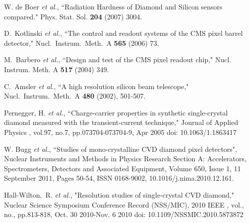 \documentclass[journal]{IEEEtran}
\begin{document}
  
\begin{thebibliography}{1}


W. de Boer \emph{et al.}, ``Radiation Hardness of Diamond and Silicon sensors compared." Phys. Stat. Sol. {\bf 204} (2007) 3004.

D.~Kotlinski \emph{et al.}, ``The control and readout systems of the CMS pixel barrel detector," Nucl.\ Instrum.\ Meth.\  A {\bf 565} (2006) 73.

M.~Barbero \emph{et al.}, ``Design and test of the CMS pixel readout chip," Nucl. Instrum. Meth. A
{\bf 517} (2004) 349.

C.~Amsler \emph{et al.}, ``A high resolution silicon beam telescope," Nucl.\ Instrum.\ Meth.\  A {\bf 480} (2002), 501-507.

Pernegger, H. \emph{et al.}, ``Charge-carrier properties in synthetic single-crystal diamond measured with the transient-current technique," Journal of Applied Physics , vol.97, no.7, pp.073704-073704-9, Apr 2005
doi: 10.1063/1.1863417

W. Bugg \emph{et al.}, ``Studies of mono-crystalline CVD diamond pixel detectors", Nuclear Instruments and Methods in Physics Research Section A: Accelerators, Spectrometers, Detectors and Associated Equipment, Volume 650, Issue 1, 11 September 2011, Pages 50-54, ISSN 0168-9002, 10.1016/j.nima.2010.12.161.

Hall-Wilton,~R. \emph{et al.}, "Resolution studies of single-crystal CVD diamond," Nuclear Science Symposium Conference Record (NSS/MIC), 2010 IEEE , vol., no., pp.813-818, Oct. 30 2010-Nov. 6 2010
doi: 10.1109/NSSMIC.2010.5873872




\end{thebibliography}
\end{document}
